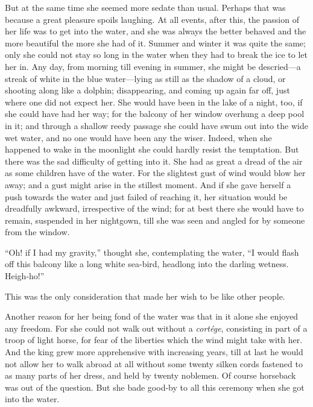 \documentclass[12pt]{memoir}
\begin{document}
But at the same time she seemed more sedate than usual.  Perhaps that
was because a great pleasure spoils laughing.  At all events, after
this, the passion of her life was to get into the water, and she was
always the better behaved and the more beautiful the more she had of
it.  Summer and winter it was quite the same; only she could not stay
so long in the water when they had to break the ice to let her in.
Any day, from morning till evening in summer, she might be
descried---a streak of white in the blue water---lying as still as the
shadow of a cloud, or shooting along like a dolphin; disappearing, and
coming up again far off, just where one did not expect her.  She would
have been in the lake of a night, too, if she could have had her way;
for the balcony of her window overhung a deep pool in it; and through
a shallow reedy passage she could have swum out into the wide wet
water, and no one would have been any the wiser.  Indeed, when she
happened to wake in the moonlight she could hardly resist the
temptation.  But there was the sad difficulty of getting into it.  She
had as great a dread of the air as some children have of the water.
For the slightest gust of wind would blow her away; and a gust might
arise in the stillest moment.  And if she gave herself a push towards
the water and just failed of reaching it, her situation would be
dreadfully awkward, irrespective of the wind; for at best there she
would have to remain, suspended in her nightgown, till she was seen
and angled for by someone from the window.

``Oh! if I had my gravity,'' thought she, contemplating the water, ``I
would flash off this balcony like a long white sea-bird, headlong into
the darling wetness.  Heigh-ho!''

This was the only consideration that made her wish to be like other
people.

Another reason for her being fond of the water was that in it alone
she enjoyed any freedom.  For she could not walk out without a
\emph{cort\'{e}ge}, consisting in part of a troop of light horse, for
fear of the liberties which the wind might take with her.  And the
king grew more apprehensive with increasing years, till at last he
would not allow her to walk abroad at all without some twenty silken
cords fastened to as many parts of her dress, and held by twenty
noblemen.  Of course horseback was out of the question.  But she bade
good-by to all this ceremony when she got into the water.
\end{document}
